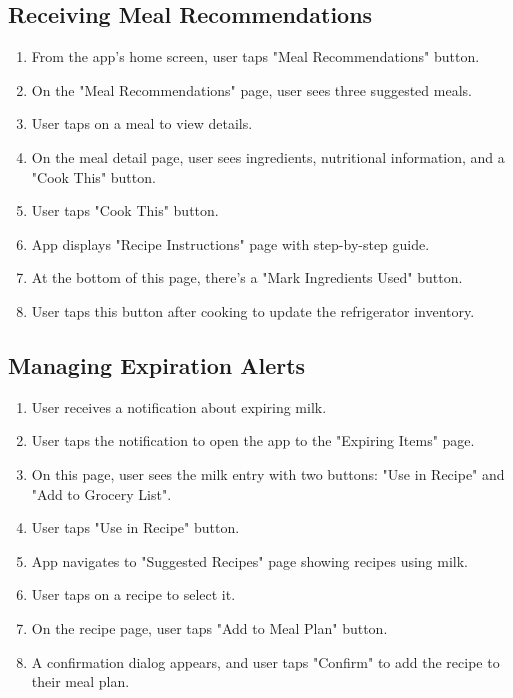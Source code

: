 \documentclass[conference]{IEEEtran}
\begin{document}
\subsection{Receiving Meal Recommendations}
\begin{enumerate}
\item From the app's home screen, user taps "Meal Recommendations" button.
\item On the "Meal Recommendations" page, user sees three suggested meals.
\item User taps on a meal to view details.
\item On the meal detail page, user sees ingredients, nutritional information, and a "Cook This" button.
\item User taps "Cook This" button.
\item App displays "Recipe Instructions" page with step-by-step guide.
\item At the bottom of this page, there's a "Mark Ingredients Used" button.
\item User taps this button after cooking to update the refrigerator inventory.
\end{enumerate}
\subsection{Managing Expiration Alerts}
\begin{enumerate}
\item User receives a notification about expiring milk.
\item User taps the notification to open the app to the "Expiring Items" page.
\item On this page, user sees the milk entry with two buttons: "Use in Recipe" and "Add to Grocery List".
\item User taps "Use in Recipe" button.
\item App navigates to "Suggested Recipes" page showing recipes using milk.
\item User taps on a recipe to select it.
\item On the recipe page, user taps "Add to Meal Plan" button.
\item A confirmation dialog appears, and user taps "Confirm" to add the recipe to their meal plan.
\end{enumerate}
\end{document}
